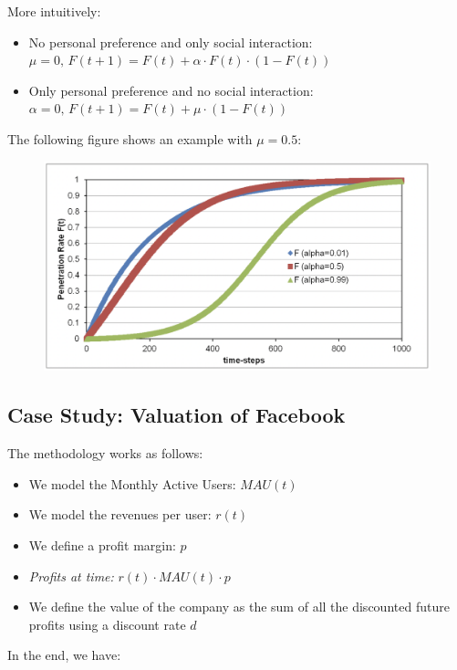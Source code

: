 \documentclass[a4paper]{extarticle}
\begin{document}
More intuitively:

\begin{itemize}
    \item No personal preference and only social interaction: $\mu = 0, \, F(t + 1) = F(t) + \alpha \cdot F(t) \cdot (1 - F(t))$
    \item Only personal preference and no social interaction: $\alpha = 0, \, F(t + 1) = F(t) + \mu \cdot (1 - F(t))$
\end{itemize}

The following figure shows an example with $\mu = 0.5$:

\begin{figure}[H]
    \includegraphics[width=13cm]{../images/EnpRisk_Fig7-2}
    \centering
\end{figure}

\subsection{Case Study: Valuation of Facebook}

The methodology works as follows:

\begin{itemize}
    \item We model the Monthly Active Users: $MAU(t)$
    \item We model the revenues per user: $r(t)$
    \item We define a profit margin: $p$
    \item \textit{Profits at time:} $r(t) \cdot MAU(t) \cdot p$
    \item We define the value of the company as the sum of all the discounted future profits using a discount rate $d$
\end{itemize}

In the end, we have:
\end{document}
